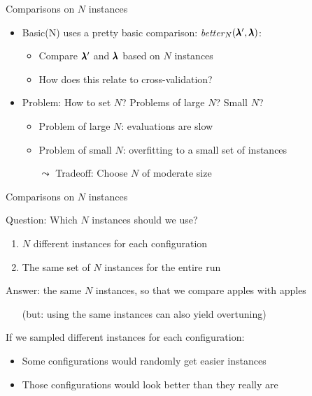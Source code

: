 \begin{frame}[c]{Comparisons on $N$ instances }

\begin{itemize}
\item \alert{Basic(N)} uses a pretty basic comparison: \textit{better$_N(\pmb{\lambda}', \pmb{\lambda})$}:
\begin{itemize}
\item Compare $\pmb{\lambda}'$ and $\pmb{\lambda}$ based on $N$ instances 
\pause
\item How does this relate to cross-validation? 
\end{itemize}  

\bigskip
\pause
\item Problem: How to set $N$? Problems of large $N$? Small $N$? 
\pause
\begin{itemize}
\item Problem of large $N$: evaluations are slow
\item Problem of small $N$: overfitting to a small set of instances
\item[$\leadsto$] Tradeoff: Choose $N$ of moderate size 
\end{itemize}

\end{itemize}
\end{frame}


\begin{frame}[c]{Comparisons on $N$ instances }


Question: \alert{Which} $N$ instances should we use? 
\begin{enumerate}
\item $N$ different instances for each configuration
\item The same set of $N$ instances for the entire run
\end{enumerate}

\bigskip
\pause
Answer: the same $N$ instances, so that we compare apples with apples
\begin{itemize}
\item[] (but: using the same instances can also yield overtuning) 
\end{itemize}
\bigskip

\pause
If we sampled different instances for each configuration:
\begin{itemize}
\item Some configurations would randomly get easier instances
\item Those configurations would look better than they really are
\end{itemize}

\end{frame}




